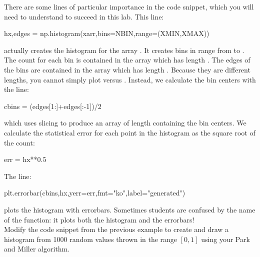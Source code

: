 {There are some lines of particular importance in the code snippet,
which you will need to understand to succeed in this lab.  This line:
\begin{python}
hx,edges = np.histogram(xarr,bins=NBIN,range=(XMIN,XMAX))
\end{python}
actually creates the histogram for the array .  It creates
 bins in range from  to .
The count for each bin is contained in the array  which has length .  The edges of the bins are contained in the array  which has length . Because they are different lengths, you cannot simply plot  versus .  Instead, we calculate the bin centers with the line:
\begin{python}
cbins = (edges[1:]+edges[:-1])/2
\end{python}
which uses slicing to produce an array of length 
containing the bin centers.
We calculate the statistical error for each point in the histogram as the square root of the count:
\begin{python}
err   = hx**0.5
\end{python}
The line:
\begin{python}
plt.errorbar(cbins,hx,yerr=err,fmt="ko",label="generated")
\end{python}
plots the histogram with errorbars.  Sometimes students are confused
by the name of the  function: it plots both the
histogram and the errorbars!\\

\plot Modify the code snippet from the previous example to create and
draw a histogram from 1000 random values thrown in the range $[0,1]$
using your Park and Miller algorithm.\\

}
